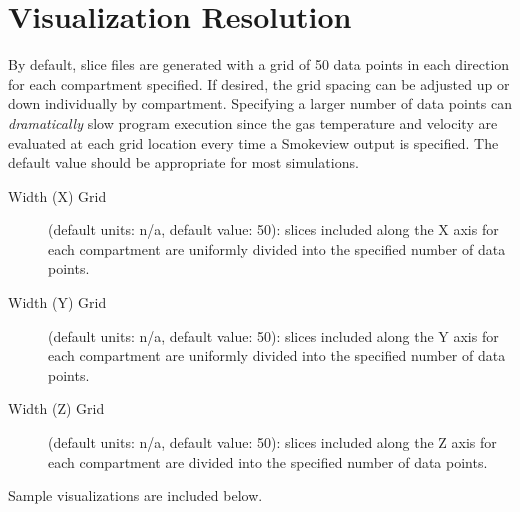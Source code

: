 
\section{Visualization Resolution}

By default, slice files are generated with a grid of 50 data points in each direction for each compartment specified. If desired, the grid spacing can be adjusted up or down individually by compartment. Specifying a larger number of data points can \textit{dramatically} slow program execution since the gas temperature and velocity are evaluated at each grid location every time a Smokeview output is specified.  The default value should be appropriate for most simulations.

\begin{description}
\item[Width (X) Grid] (default units: n/a, default value: 50): slices included along the X axis for each compartment are uniformly divided into the specified number of data points.

\item[Width (Y) Grid] (default units: n/a, default value: 50): slices included along the Y axis for each compartment are uniformly divided into the specified number of data points.

\item[Width (Z) Grid] (default units: n/a, default value: 50): slices included along the Z axis for each compartment are divided into the specified number of data points.
\end{description}

Sample visualizations are included below.

